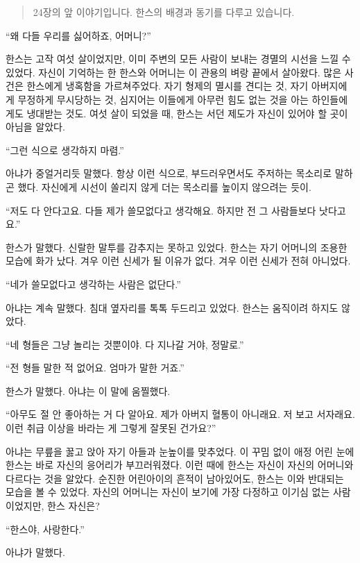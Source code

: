 \begin{quote}

\small 24장의 앞 이야기입니다. 한스의 배경과 동기를 다루고 있습니다.

\end{quote} %

``왜 다들 우리를 싫어하죠, 어머니?''

한스는 고작 여섯 살이었지만, 이미 주변의 모든 사람이 보내는 경멸의 시선을 느낄 수 있었다. 자신이 기억하는 한 한스와 어머니는 이 관용의 벼랑 끝에서 살아왔다. 많은 사건은 한스에게 냉혹함을 가르쳐주었다. 자기 형제의 멸시를 견디는 것, 자기 아버지에게 무정하게 무시당하는 것, 심지어는 이들에게 아무런 힘도 없는 것을 아는 하인들에게도 냉대받는 것도. 여섯 살이 되었을 때, 한스는 서던 제도가 자신이 있어야 할 곳이 아님을 알았다.

``그런 식으로 생각하지 마렴.''

아냐가 중얼거리듯 말했다. 항상 이런 식으로, 부드러우면서도 주저하는 목소리로 말하곤 했다. 자신에게 시선이 쏠리지 않게 더는 목소리를 높이지 않으려는 듯이.

``저도 다 안다고요. 다들 제가 쓸모없다고 생각해요. 하지만 전 그 사람들보다 낫다고요.''

한스가 말했다. 신랄한 말투를 감추지는 못하고 있었다. 한스는 자기 어머니의 조용한 모습에 화가 났다. 겨우 이런 신세가 될 이유가 없다. 겨우 이런 신세가 전혀 아니었다.

``네가 쓸모없다고 생각하는 사람은 없단다.''

아냐는 계속 말했다. 침대 옆자리를 톡톡 두드리고 있었다. 한스는 움직이려 하지도 않았다.

``네 형들은 그냥 놀리는 것뿐이야. 다 지나갈 거야, 정말로.''

``전 형들 말한 적 없어요. 엄마가 말한 거죠.''

한스가 말했다. 아냐는 이 말에 움찔했다.

``아무도 절 안 좋아하는 거 다 알아요. 제가 아버지 혈통이 아니래요. 저 보고 서자래요. 이런 취급 이상을 바라는 게 그렇게 잘못된 건가요?''

아냐는 무릎을 꿇고 앉아 자기 아들과 눈높이를 맞추었다. 이 꾸밈 없이 애정 어린 눈에 한스는 바로 자신의 응어리가 부끄러워졌다. 이런 때에 한스는 자신이 자신의 어머니와 다르다는 것을 알았다. 순진한 어린아이의 흔적이 남아있어도, 한스는 이와 반대되는 모습을 볼 수 있었다. 자신의 어머니는 자신이 보기에 가장 다정하고 이기심 없는 사람이었지만, 한스 자신은?

``한스야, 사랑한다.''

아냐가 말했다.

